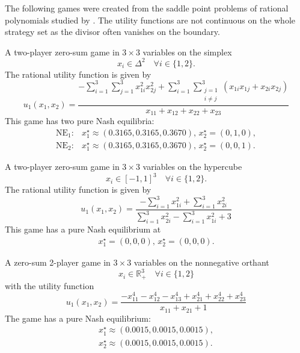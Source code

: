 

The following games were created from the saddle point problems of rational polynomials studied by \textcite{zhou.wang.ea:saddle}. The utility functions are not continuous on the whole strategy set as the divisor often vanishes on the boundary.

\begin{game}\label{ex.zhou19.5.1}

A two-player zero-sum game in $3 \times 3$ variables on the simplex
\[
x_i \in \Delta^{2} \quad \forall i \in \{1,2\}.
\]
The rational utility function \cite[Example~5.1]{zhou.wang.ea:saddle} is given by
\[
u_1(x_1, x_2) =
\frac{
- \sum_{i=1}^{3} \sum_{j=1}^{3} x_{1i}^2 x_{2j}^2 + \sum_{i=1}^{3} \sum_{\substack{j=1 \\ i \ne j}}^{3} (x_{1i} x_{1j} + x_{2i} x_{2j})
}{
x_{11} + x_{12} + x_{22} + x_{23}
}
\]
This game has two pure Nash equilibria:
\begin{align*}
\text{NE}_1: &x_1^\star \approx (0.3165, 0.3165, 0.3670),\,x_2^\star = (0, 1, 0),\\
\text{NE}_2: &x_1^\star \approx (0.3165, 0.3165, 0.3670),\,x_2^\star = (0, 0, 1).
\end{align*}
\end{game}

\begin{game}\label{ex.zhou19.5.2.ii}
A two-player zero-sum game in $3 \times 3$ variables on the hypercube
\[
x_i \in [-1,1]^3 \quad \forall i \in \{1,2\}.
\]
The rational utility function \cite[Example~5.2 (ii)]{zhou.wang.ea:saddle} is given by
\[
u_1(x_1, x_2) =
\frac{
- \sum_{i=1}^{3} x_{1i}^2 + \sum_{i=1}^{3} x_{2i}^2
}{
\sum_{i=1}^{3} x_{2i}^2 - \sum_{i=1}^{3} x_{1i}^2 + 3
}
\]
This game has a pure Nash equilibrium at
\begin{align*}
x_1^\star = (0, 0, 0),\, x_2^\star = (0, 0, 0).
\end{align*}
\end{game}

\begin{game}\label{ex.zhou19.5.4.i}
A zero-sum 2-player game in $3 \times 3$ variables on the nonnegative orthant
\[
x_i \in \mathbb{R}^3_+ \quad \forall i \in \{1,2\}
\]
with the utility function \cite[Example~5.4 (i)]{zhou.wang.ea:saddle}
\[
u_1(x_1, x_2) =
\frac{
- x_{11}^4 - x_{12}^4 - x_{13}^4 + x_{21}^4 + x_{22}^4 + x_{23}^4
}{
x_{11} + x_{21} + 1
}
\]
The game has a pure Nash equilibrium:
\begin{align*}
x_1^\star \approx (0.0015, 0.0015, 0.0015), \\
x_2^\star \approx (0.0015, 0.0015, 0.0015).
\end{align*}
\end{game}


